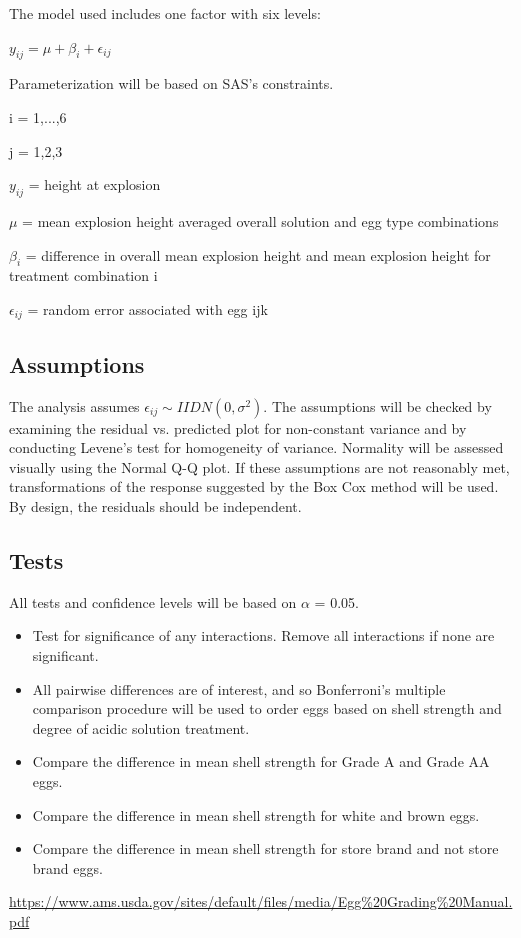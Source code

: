 \documentclass{article}\usepackage[]{graphicx}\usepackage[]{color}
\begin{document}
The model used includes one factor with six levels:

\begin{center}
$y_{ij} = \mu + \beta_{i} + \epsilon_{ij}$
\end{center}

Parameterization will be based on SAS's constraints.

i = 1,...,6

j = 1,2,3

$y_{ij}$ = height at explosion 

$\mu$ = mean explosion height averaged overall solution and egg type combinations

$\beta_{i}$ = difference in overall mean explosion height and mean explosion height for treatment combination i

$\epsilon_{ij}$ = random error associated with egg ijk

\subsection{Assumptions}

The analysis assumes $\epsilon_{ij} \sim IIDN(0,\sigma^{2})$. The assumptions will be checked by examining the residual vs. predicted plot for non-constant variance and by conducting Levene's test for homogeneity of variance. Normality will be assessed visually using the Normal Q-Q plot. If these assumptions are not reasonably met, transformations of the response suggested by the Box Cox method will be used. By design, the residuals should be independent.


\subsection{Tests}

All tests and confidence levels will be based on $\alpha$ = 0.05.
\begin{itemize}
\item Test for significance of any interactions. Remove all interactions if none are significant.

\item All pairwise differences are of interest, and so Bonferroni's multiple comparison procedure will be used to order eggs based on shell strength and degree of acidic solution treatment.

\item Compare the difference in mean shell strength for Grade A and Grade AA eggs.

\item Compare the difference in mean shell strength for white and brown eggs.

\item Compare the difference in mean shell strength for store brand and not store brand eggs.

\end{itemize}

\url{https://www.ams.usda.gov/sites/default/files/media/Egg%20Grading%20Manual.pdf}
\end{document}
